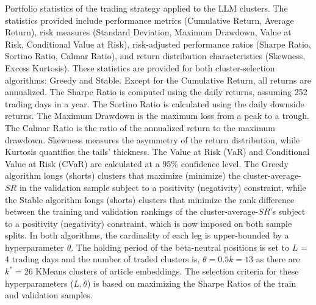 \documentclass[12pt,article]{memoir}
\begin{document}
\begin{landscape}
\begin{table}[H]
\begin{minipage}{\textwidth}
{Portfolio statistics of the trading strategy applied to the LLM clusters.
The statistics provided include performance metrics (Cumulative Return, Average Return), risk measures (Standard Deviation, Maximum Drawdown, Value at Risk, Conditional Value at Risk), risk-adjusted performance ratios (Sharpe Ratio, Sortino Ratio, Calmar Ratio), and return distribution characteristics (Skewness, Excess Kurtosis). These statistics are provided for both cluster-selection algorithms: Greedy and Stable. 
Except for the Cumulative Return, all returns are annualized. The Sharpe Ratio is computed using the daily returns, assuming 252 trading days in a year. The Sortino Ratio is calculated using the daily downside returns. The Maximum Drawdown is the maximum loss from a peak to a trough. The Calmar Ratio is the ratio of the annualized return to the maximum drawdown. Skewness measures the asymmetry of the return distribution, while Kurtosis quantifies the tails' thickness. The Value at Risk (VaR) and Conditional Value at Risk (CVaR) are calculated at a 95\% confidence level.
The Greedy algorithm longs (shorts) clusters that maximize (minimize) the cluster-average-$SR$ in the validation sample subject to a positivity (negativity) constraint, while the Stable algorithm longs (shorts) clusters that minimize the rank difference between the training and validation rankings of the cluster-average-$SR$'s subject to a positivity (negativity) constraint, which is now imposed on both sample splits. In both algorithms, the cardinality of each leg is upper-bounded by a hyperparameter $\theta$. 
The holding period of the beta-neutral positions is set to $L$ = 4 trading days and the number of traded clusters is, $\theta = 0.5k=13$ as there are $k^*=26$ KMeans clusters of article embeddings. The selection criteria for these hyperparameters ($L,\theta$) is based on maximizing the Sharpe Ratios of the train and validation samples.
}
\end{minipage}
\end{table}
\end{landscape}
\end{document}
